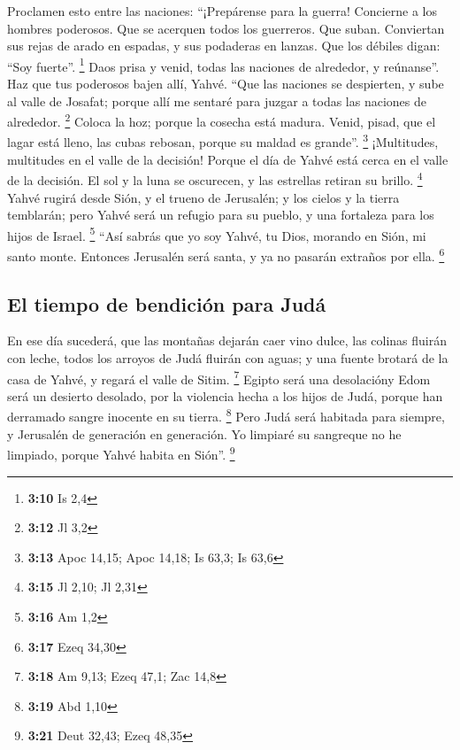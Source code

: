 \begin{paracol}{2}
 Proclamen esto entre las naciones: ``¡Prepárense para la
guerra! Concierne a los hombres poderosos. Que se acerquen todos los
guerreros. Que suban.  Conviertan sus rejas de arado en
espadas, y sus podaderas en lanzas. Que los débiles digan: ``Soy
fuerte''. \footnote{\textbf{3:10} Is 2,4}  Daos prisa y
venid, todas las naciones de alrededor, y reúnanse''. Haz que tus
poderosos bajen allí, Yahvé.  ``Que las naciones se
despierten, y sube al valle de Josafat; porque allí me sentaré para
juzgar a todas las naciones de alrededor. \footnote{\textbf{3:12} Jl 3,2}
 Coloca la hoz; porque la cosecha está madura. Venid,
pisad, que el lagar está lleno, las cubas rebosan, porque su maldad es
grande''. \footnote{\textbf{3:13} Apoc 14,15; Apoc 14,18; Is 63,3; Is
  63,6}  ¡Multitudes, multitudes en el valle de la
decisión! Porque el día de Yahvé está cerca en el valle de la decisión.
 El sol y la luna se oscurecen, y las estrellas retiran
su brillo. \footnote{\textbf{3:15} Jl 2,10; Jl 2,31} 
Yahvé rugirá desde Sión, y el trueno de Jerusalén; y los cielos y la
tierra temblarán; pero Yahvé será un refugio para su pueblo, y una
fortaleza para los hijos de Israel. \footnote{\textbf{3:16} Am 1,2}
 ``Así sabrás que yo soy Yahvé, tu Dios, morando en Sión,
mi santo monte. Entonces Jerusalén será santa, y ya no pasarán extraños
por ella. \footnote{\textbf{3:17} Ezeq 34,30}

\hypertarget{el-tiempo-de-bendiciuxf3n-para-juduxe1}{%
\subsection{El tiempo de bendición para
Judá}\label{el-tiempo-de-bendiciuxf3n-para-juduxe1}}

 En ese día sucederá, que las montañas dejarán caer vino
dulce, las colinas fluirán con leche, todos los arroyos de Judá fluirán
con aguas; y una fuente brotará de la casa de Yahvé, y regará el valle
de Sitim. \footnote{\textbf{3:18} Am 9,13; Ezeq 47,1; Zac 14,8}
 Egipto será una desolacióny Edom será un desierto
desolado, por la violencia hecha a los hijos de Judá, porque han
derramado sangre inocente en su tierra. \footnote{\textbf{3:19} Abd 1,10}
 Pero Judá será habitada para siempre, y Jerusalén de
generación en generación.  Yo limpiaré su sangreque no he
limpiado, porque Yahvé habita en Sión''. \footnote{\textbf{3:21} Deut
  32,43; Ezeq 48,35} \switchcolumn
\begin{otherlanguage}{english}


\end{otherlanguage}
\end{paracol}
